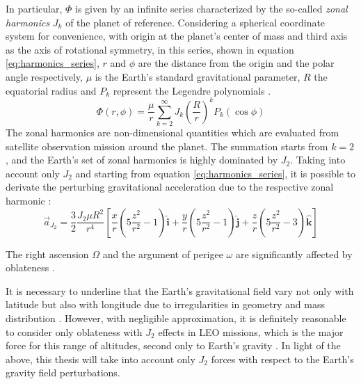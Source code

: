 In particular, $\Phi$ is given by an infinite series characterized by the so-called \textit{zonal harmonics} $J_k$ of the planet of reference.
Considering a spherical coordinate system for convenience, with origin at the planet's center of mass and third axis as the axis of rotational symmetry,
in this series, shown in equation \ref{eq:harmonics_series}, $r$ and $\phi$ are the distance from the origin and the polar angle respectively, $\mu$ is the Earth's standard gravitational parameter, $R$ the equatorial radius and $P_k$ represent the Legendre polynomials \cite{curtis2020orbital}.
\begin{equation} \label{eq:harmonics_series}
    \Phi (r,\phi) = \frac{\mu}{r} \sum_{k=2}^{\infty} J_k \left(\frac{R}{r} \right)^k P_k (\cos{\phi})
\end{equation}
The zonal harmonics are non-dimensional quantities which are evaluated from satellite observation mission around the planet.
The summation starts from $k = 2$, and the Earth's set of zonal harmonics is highly dominated by $J_2$.
Taking into account only $J_2$ and starting from equation \ref{eq:harmonics_series}, it is possible to derivate the perturbing gravitational acceleration due to the respective zonal harmonic \cite{curtis2020orbital}:
\begin{equation} \label{eq:j2_acc}
    \vec{a}_{J_2} = \frac{3}{2} \frac{J_2 \mu R^2}{r^4} \left[\frac{x}{r}\left(5 \frac{z^2}{r^2} - 1 \right)\hat{\textbf{i}} + \frac{y}{r}\left(5 \frac{z^2}{r^2} - 1\right)\hat{\textbf{j}} + \frac{z}{r}\left(5 \frac{z^2}{r^2} - 3\right)\hat{\textbf{k}} \right]
\end{equation}

The right ascension $\Omega$ and the argument of perigee $\omega$ are significantly affected by oblateness \cite{curtis2020orbital}.

It is necessary to underline that the Earth's gravitational field vary not only with latitude but also with longitude due to irregularities in geometry and mass distribution \cite{curtis2020orbital}.
However, with negligible approximation, it is definitely reasonable to consider only oblateness with $J_2$ effects in LEO missions, which is the major force for this range of altitudes, second only to Earth's gravity \cite{brown1998spacecraft}.
In light of the above, this thesis will take into account only $J_2$ forces with respect to the Earth's gravity field perturbations.


